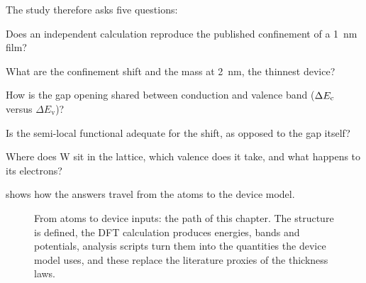 The study therefore asks five questions:
\begin{description}[leftmargin=1.2em]
\item[Q1] Does an independent calculation reproduce the published confinement of a 1~nm film?
\item[Q2] What are the confinement shift and the mass at 2~nm, the thinnest device?
\item[Q3] How is the gap opening shared between conduction and valence band ($\Delta E_{\mathrm{c}}$ versus $\Delta E_{\mathrm{v}}$)?
\item[Q4] Is the semi-local functional adequate for the shift, as opposed to the gap itself?
\item[Q5] Where does W sit in the lattice, which valence does it take, and what happens to its electrons?
\end{description}
 shows how the answers travel from the atoms to the device model.

\begin{figure}[htbp]\centering
{}
\caption{From atoms to device inputs: the path of this chapter. The structure is defined, the DFT calculation
produces energies, bands and potentials, analysis scripts turn them into the quantities the device model uses, and
these replace the literature proxies of the thickness laws.}
\label{fig:dft-pipeline}
\end{figure}

